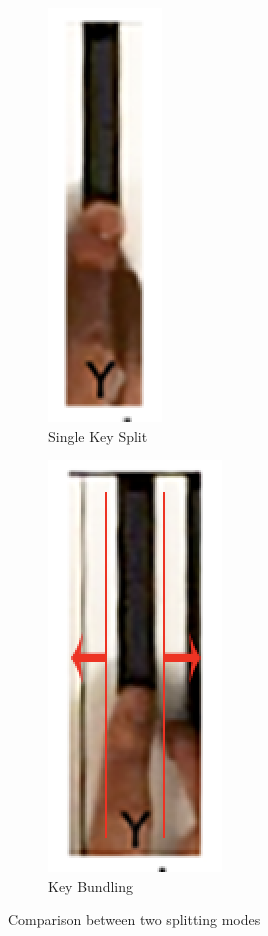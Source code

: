 \documentclass[10pt,twocolumn,letterpaper]{article}
\begin{document}
\begin{figure}[h!]
   \begin{subfigure}{0.2\textwidth}
      \centering
      \includegraphics[width=0.26\linewidth]{fig/15.png}
      \caption{Single Key Split} \label{fig:k}
    \end{subfigure}\hspace*{\fill}
    \begin{subfigure}{0.2\textwidth}
      \centering
      \includegraphics[width=0.4\linewidth]{fig/14.png}
      \caption{Key Bundling} \label{fig:l}
    \end{subfigure}
   \caption{Comparison between two splitting modes} \label{fig:4}
\end{figure}   
\end{document}
